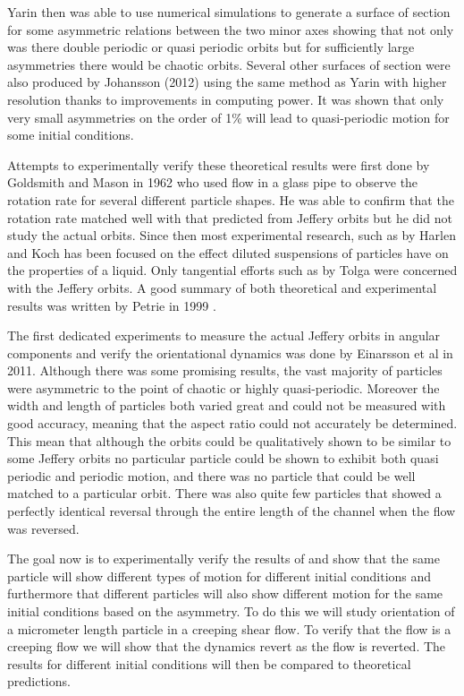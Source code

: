 Yarin then was able to use numerical simulations to generate a surface of section \cite{SurfaceOfSection} for some asymmetric relations between the two minor axes showing that not only was there double periodic or quasi periodic orbits but for sufficiently large asymmetries there would be chaotic orbits. 
Several other surfaces of section were also produced by Johansson (2012)\cite{AntonThesis} using the same method as Yarin with higher resolution thanks to improvements in computing power. It was shown that only very small asymmetries on the order of 1\% will lead to quasi-periodic motion for some initial conditions.

Attempts to experimentally verify these theoretical results were first done by Goldsmith and Mason in 1962\cite{Mason} who used flow in a glass pipe to observe the rotation rate for several different particle shapes. He was able to confirm that the rotation rate matched well with that predicted from Jeffery orbits but he did not study the actual orbits. Since then most experimental research, such as by Harlen and Koch\cite{fibersspension} has been focused on the effect diluted suspensions of particles have on the properties of a liquid. Only tangential efforts such as by Tolga\cite{Tolga} were concerned with the Jeffery orbits. A good summary of both theoretical and experimental results was written by Petrie in 1999 \cite{Petrie}.

The first dedicated experiments to measure the actual Jeffery orbits in angular components and verify the orientational dynamics was done by Einarsson et al \cite{JonasExperiment} in 2011. Although there was some promising results, the vast majority of particles were asymmetric to the point of chaotic or highly quasi-periodic. Moreover the width and length of particles both varied great and could not be measured with good accuracy, meaning that the aspect ratio could not accurately be determined. This mean that although the orbits could be qualitatively shown to be similar to some Jeffery orbits no particular particle could be shown to exhibit both quasi periodic and periodic motion, and there was no particle that could be well matched to a particular orbit. There was also quite few particles that showed a perfectly identical reversal through the entire length of the channel when the flow was reversed.


The goal now is to experimentally verify the results of \cite{Yarin, Leal} and show that the same particle will show different types of motion for different initial conditions and furthermore that different particles will also show different motion for the same initial conditions based on the asymmetry. To do this we will study orientation of a micrometer length particle in a creeping shear flow. To verify that the flow is a creeping flow we will show that the dynamics revert as the flow is reverted. The results for different initial conditions will then be compared to theoretical predictions.

